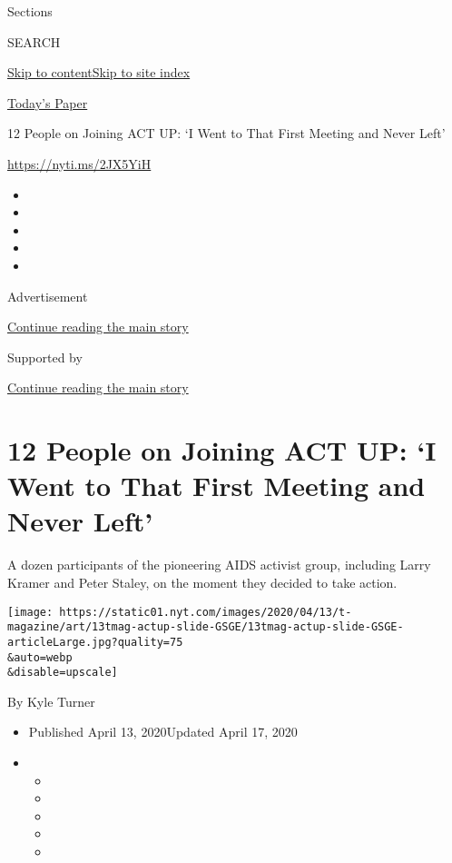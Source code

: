 Sections

SEARCH

\protect\hyperlink{site-content}{Skip to
content}\protect\hyperlink{site-index}{Skip to site index}

\href{https://myaccount.nytimes.com/auth/login?response_type=cookie\&client_id=vi}{}

\href{https://www.nytimes.com/section/todayspaper}{Today's Paper}

12 People on Joining ACT UP: `I Went to That First Meeting and Never
Left'

\href{https://nyti.ms/2JX5YiH}{https://nyti.ms/2JX5YiH}

\begin{itemize}
\item
\item
\item
\item
\item
\end{itemize}

Advertisement

\protect\hyperlink{after-top}{Continue reading the main story}

Supported by

\protect\hyperlink{after-sponsor}{Continue reading the main story}

\hypertarget{12-people-on-joining-act-up-i-went-to-that-first-meeting-and-never-left}{%
\section{12 People on Joining ACT UP: `I Went to That First Meeting and
Never
Left'}\label{12-people-on-joining-act-up-i-went-to-that-first-meeting-and-never-left}}

A dozen participants of the pioneering AIDS activist group, including
Larry Kramer and Peter Staley, on the moment they decided to take
action.

\texttt{[image: https://static01.nyt.com/images/2020/04/13/t-magazine/art/13tmag-actup-slide-GSGE/13tmag-actup-slide-GSGE-articleLarge.jpg?quality=75\\\&auto=webp\\\&disable=upscale]}

By Kyle Turner

\begin{itemize}
\item
  Published April 13, 2020Updated April 17, 2020
\item
  \begin{itemize}
  \item
  \item
  \item
  \item
  \item
  \end{itemize}
\end{itemize}

